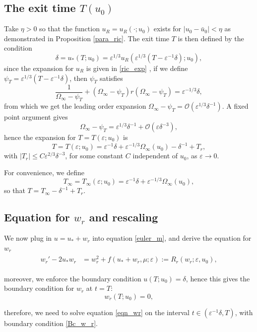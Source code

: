 \documentclass[letterpaper,11pt]{article}
\newcommand{\rmO}{\mathcal{O}}
\newcommand{\eps}{\varepsilon}
\numberwithin{equation}{section}
\theoremstyle{plain}
\begin{document}
\subsection{The exit time \texorpdfstring{$T(u_0)$}{T(u_0)}}\label{exit_time}
Take $\eta>0$ so that the function $u_R = u_R(\cdot; u_0)$ exists for $|u_0-\bar{u}_0|<\eta$ as demonstrated in Proposition \ref{para_ric}. The exit time $T$ is then defined by the condition 
\[
\delta = u_*(T; u_0) = \eps^{1/3}u_R(\eps^{1/3}(T-\eps^{-1}\delta); u_0),
\]
since the expansion for $u_R$ is given in \eqref{ric_exp} , if we define $\psi_T = \eps^{1/3}(T-\eps^{-1}\delta)$, then $\psi_T$ satisfies
\[
\frac{1}{\Omega_\infty-\psi_T} + (\Omega_\infty-\psi_T)r(\Omega_\infty-\psi_T) = \eps^{-1/3}\delta,
\]
from which we get the leading order expansion $\Omega_\infty-\psi_T = \rmO(\eps^{1/3}\delta^{-1})$. A fixed point argument gives
\[
\Omega_\infty - \psi_T = \eps^{1/3}\delta^{-1} + \rmO(\eps \delta^{-3}),
\]
hence the expansion for $T=T(\eps; u_0)$ is
\begin{equation}\label{T_exp}
T = T(\eps;u_0) = \eps^{-1}\delta + \eps^{-1/3}\Omega_\infty(u_0) - \delta^{-1} + T_r,
\end{equation}
with 
$|T_r|\le C\eps^{2/3}\delta^{-3}$, for some constant $C$ independent of $u_0$, as $\eps \to 0$.

For convenience, we define \[
T_\infty = T_\infty(\eps; u_0)= \eps^{-1}\delta + \eps^{-1/3}\Omega_\infty(u_0),
\]
so that $T = T_\infty - \delta^{-1} + T_r$.

\subsection{Equation for \texorpdfstring{$w_r$}{wr} and rescaling}\label{equation_wr}
We now plug in $u = u_* + w_r$ into equation \eqref{euler_m}, and derive the equation for $w_r$
\begin{align}\label{eqn_wr}
\begin{split}
w_r' - 2u_*w_r &= w_r^2 + f(u_*+w_r, \mu; \eps) := R_r(w_r; \eps,u_0),
\end{split}
\end{align}

moreover, we enforce the boundary condition $u(T; u_0) = \delta$, hence this gives the boundary condition for $w_r$ at $t=T$:
\begin{equation}\label{Bc_w_r}
w_r(T;u_0) = 0,
\end{equation}


therefore, we need to solve equation \eqref{eqn_wr} on the interval $t \in (\eps^{-1}\delta, T)$, with boundary condition \eqref{Bc_w_r}.
\end{document}

